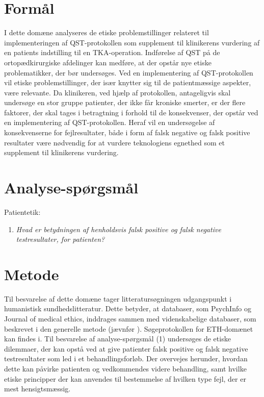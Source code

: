 \section{Formål}
I dette domæne analyseres de etiske problemstillinger relateret til implementeringen af QST-protokollen som supplement til klinikerens vurdering af en patients indstilling til en TKA-operation. Indførelse af QST på de ortopædkirurgiske afdelinger kan medføre, at der opstår nye etiske problematikker, der bør undersøges. Ved en implementering af QST-protokollen vil etiske problemstillinger, der især knytter sig til de patientmæssige aspekter, være relevante. Da klinikeren, ved hjælp af protokollen, antageligvis skal undersøge en stor gruppe patienter, der ikke får kroniske smerter, er der flere faktorer, der skal tages i betragtning i forhold til de konsekvenser, der opstår ved en implementering af QST-protokollen. Heraf vil en undersøgelse af konsekvenserne for fejlresultater, både i form af falsk negative og falsk positive resultater være nødvendig for at vurdere teknologiens egnethed som et supplement til klinikerens vurdering.

\section{Analyse-spørgsmål}
Patientetik:
\begin{enumerate}
\item \textit{Hvad er betydningen af henholdsvis falsk positive og falsk negative testresultater, for patienten?} %
\end{enumerate}

\section{Metode}
Til besvarelse af dette domæne tager litteratursøgningen udgangspunkt i humanistisk sundhedslitteratur. Dette betyder, at databaser, som PsychInfo og Journal of medical ethics, inddrages sammen med videnskabelige databaser, som beskrevet i den generelle metode (jævnfør ). Søgeprotokollen for ETH-domænet kan findes i.
Til besvarelse af analyse-spørgsmål (1) undersøges de etiske dilemmaer, der kan opstå ved at give patienter falsk positive og falsk negative testresultater som led i et behandlingsforløb. Der overvejes herunder, hvordan dette kan påvirke patienten og vedkommendes videre behandling, samt hvilke etiske principper der kan anvendes til bestemmelse af hvilken type fejl, der er mest hensigtsmæssig.

